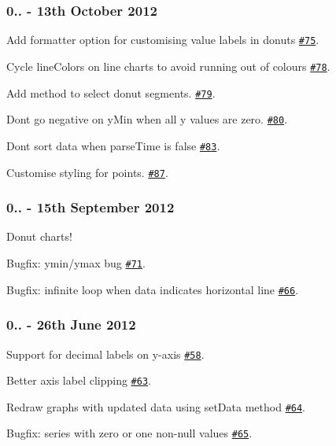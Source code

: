 \subsubsection*{0.. -\/ 13th October 2012}


\begin{DoxyItemize}
\item Add {\ttfamily formatter} option for customising value labels in donuts \href{https://github.com/morrisjs/morris.js/issues/75}{\tt \#75}.
\item Cycle {\ttfamily line\+Colors} on line charts to avoid running out of colours \href{https://github.com/morrisjs/morris.js/issues/78}{\tt \#78}.
\item Add method to select donut segments. \href{https://github.com/morrisjs/morris.js/issues/79}{\tt \#79}.
\item Don\textquotesingle{}t go negative on y\+Min when all y values are zero. \href{https://github.com/morrisjs/morris.js/issues/80}{\tt \#80}.
\item Don\textquotesingle{}t sort data when parse\+Time is false \href{https://github.com/morrisjs/morris.js/issues/83}{\tt \#83}.
\item Customise styling for points. \href{https://github.com/morrisjs/morris.js/issues/87}{\tt \#87}.
\end{DoxyItemize}

\subsubsection*{0.. -\/ 15th September 2012}


\begin{DoxyItemize}
\item Donut charts!
\item Bugfix\+: ymin/ymax bug \href{https://github.com/morrisjs/morris.js/issues/71}{\tt \#71}.
\item Bugfix\+: infinite loop when data indicates horizontal line \href{https://github.com/morrisjs/morris.js/issues/66}{\tt \#66}.
\end{DoxyItemize}

\subsubsection*{0.. -\/ 26th June 2012}


\begin{DoxyItemize}
\item Support for decimal labels on y-\/axis \href{https://github.com/morrisjs/morris.js/issues/58}{\tt \#58}.
\item Better axis label clipping \href{https://github.com/morrisjs/morris.js/issues/63}{\tt \#63}.
\item Redraw graphs with updated data using {\ttfamily set\+Data} method \href{https://github.com/morrisjs/morris.js/issues/64}{\tt \#64}.
\item Bugfix\+: series with zero or one non-\/null values \href{https://github.com/morrisjs/morris.js/issues/65}{\tt \#65}.
\end{DoxyItemize}

